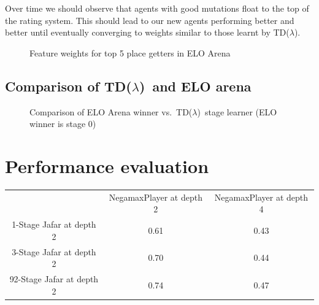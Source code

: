 \documentclass[11pt]{article}
\newcommand{\tdl}{TD($\lambda$)}
\begin{document}
Over time we should observe that agents with good mutations float to the top of the rating system.
This should lead to our new agents performing better and better until eventually
converging to weights similar to those learnt by \tdl.

\begin{figure}[htbp]
  \centering
  \caption{Feature weights for top 5 place getters in ELO Arena}
  \label{fig:elo_arena_weights}
\end{figure}

\subsection{Comparison of \tdl\ and ELO arena}
\label{sub:comparing_learning}

\begin{figure}[htbp]
  \centering
  \caption{Comparison of ELO Arena winner vs.\ \tdl\ stage
    learner (ELO winner is stage 0)}
  \label{fig:elo_arena_comp}
\end{figure}

\section{Performance evaluation}
\label{sec:performance}
\begin{tabular}{c c c}
      & NegamaxPlayer at depth 2  & NegamaxPlayer at depth 4  \\
1-Stage Jafar at depth 2  & 0.61 & 0.43 \\ 
3-Stage Jafar at depth 2    & 0.70 & 0.44\\ 
92-Stage Jafar at depth 2   & 0.74 & 0.47\\
\end{tabular}
\end{document}
